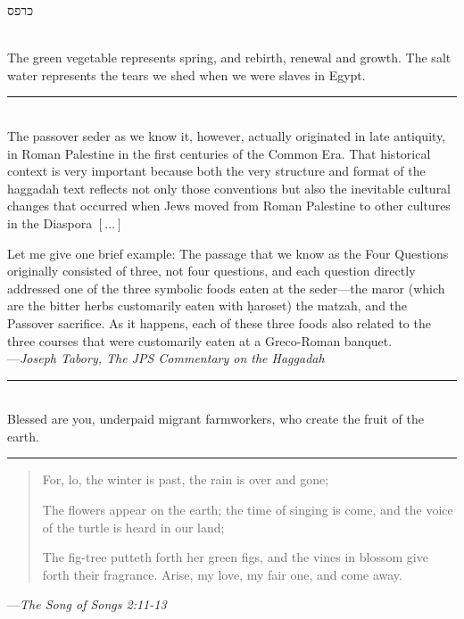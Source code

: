 \documentclass[a4paper,10pt,openany]{memoir}
\newcommand{\HgInst}[1]{{\noindent\sffamily{\bfseries{#1}}}}
\newcommand{\HgEllipsis}{\ensuremath{\left[\ldots\right]}}
\newcommand{\HgSource}[1]{\hfill{\small---\itshape{#1}}}
\newcommand{\hchapter}[1]{
  \begin{hebrew}
    \begin{Spacing}{.97}
      \newpage
      \strut

      \vspace{.15em}

      \begin{flushleft}
      \noindent\Huge #1
      \end{flushleft}

      \vspace{1em}
    \end{Spacing}
  \end{hebrew}
}
\newcommand{\HgFill}{\vfill \hrule \vfill}
\newenvironment{HgEnglish}{\strut\\\noindent}{\vspace{1em}}
\newcommand{\JSrc}{\textsuperscript{\upshape{[J]}}}
\newcommand{\SSrc}{\textsuperscript{\upshape{[S]}}}
\begin{document}
\HgInst{Eat the parsley.}

\vfill

\hchapter{כרפס}

\begin{HgEnglish}
The green vegetable represents spring, and rebirth, renewal and growth. The salt
water represents the tears we shed when we were slaves in Egypt.
\end{HgEnglish}

\HgFill

\begin{HgEnglish}
  The passover seder as we know it, however, actually originated in late
  antiquity, in Roman Palestine in the first centuries of the Common Era. That
  historical context is very important because both the very structure and
  format of the haggadah text reflects not only those conventions but also the
  inevitable cultural changes that occurred when Jews moved from Roman Palestine
  to other cultures in the Diaspora \HgEllipsis

  Let me give one brief example: The passage that we know as the
  Four Questions originally consisted of three, not four questions, and each
  question directly addressed one of the three symbolic foods eaten at the
  seder---the maror (which are the bitter herbs customarily eaten with
  \d{h}aroset) the matzah, and the Passover sacrifice. As it happens, each of
  these three foods also related to the three courses that were customarily
  eaten at a Greco-Roman banquet. \\

  \HgSource{Joseph Tabory, The JPS Commentary on the Haggadah}
\end{HgEnglish}

\HgFill

\begin{HgEnglish}
  Blessed are you, underpaid migrant farmworkers, who create the fruit of the
  earth.\SSrc
\end{HgEnglish}

\HgFill

\begin{verse}
  For, lo, the winter is past, the rain is over and gone;

  The flowers appear on the earth; the time of singing is come, and the voice of
  the turtle is heard in our land;

  The fig-tree putteth forth her green figs, and the vines in blossom give forth
  their fragrance. Arise, my love, my fair one, and come away.
\end{verse}
\HgSource{The Song of Songs 2:11-13 \JSrc}
\end{document}
